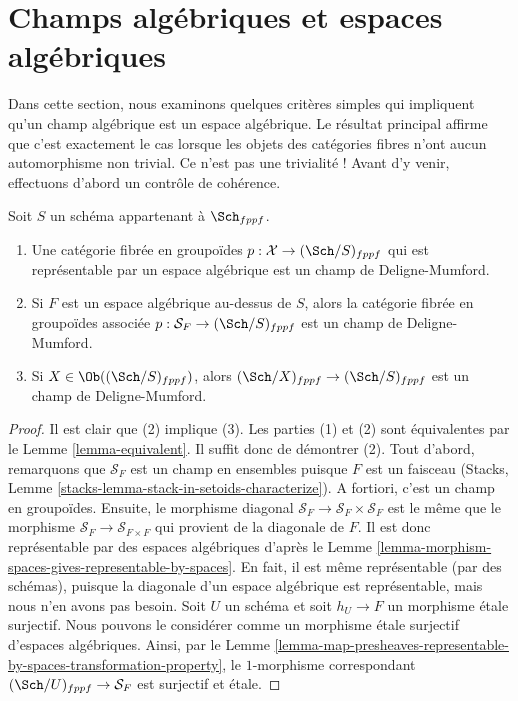 \section{Champs algébriques et espaces algébriques}
\label{section-stacks-spaces}

\noindent
Dans cette section, nous examinons quelques critères simples qui impliquent qu'un
champ algébrique est un espace algébrique. Le résultat principal affirme que c'est
exactement le cas lorsque les objets des catégories fibres n'ont aucun
automorphisme non trivial. Ce n'est pas une trivialité ! Avant d'y venir,
effectuons d'abord un contrôle de cohérence.

\begin{lemma}
\label{lemma-representable-algebraic}
Soit $S$ un schéma appartenant à $\Sch_{fppf}$.
\begin{enumerate}
\item Une catégorie fibrée en groupoïdes
$p : \mathcal{X} \to (\Sch/S)_{fppf}$
qui est représentable par un espace algébrique est un champ de Deligne-Mumford.
\item Si $F$ est un espace algébrique au-dessus de $S$, alors la
catégorie fibrée en groupoïdes associée
$p : \mathcal{S}_F \to (\Sch/S)_{fppf}$
est un champ de Deligne-Mumford.
\item Si $X \in \Ob((\Sch/S)_{fppf})$, alors
$(\Sch/X)_{fppf} \to (\Sch/S)_{fppf}$ est
un champ de Deligne-Mumford.
\end{enumerate}
\end{lemma}

\begin{proof}
Il est clair que (2) implique (3).
Les parties (1) et (2) sont équivalentes par le Lemme \ref{lemma-equivalent}.
Il suffit donc de démontrer (2).
Tout d'abord, remarquons que $\mathcal{S}_F$ est un champ en ensembles puisque
$F$ est un faisceau (Stacks, Lemme
\ref{stacks-lemma-stack-in-setoids-characterize}).
A fortiori, c'est un champ en groupoïdes. Ensuite, le morphisme diagonal
$\mathcal{S}_F \to \mathcal{S}_F  \times \mathcal{S}_F$
est le même que le morphisme $\mathcal{S}_F \to \mathcal{S}_{F \times F}$
qui provient de la diagonale de $F$. Il est donc représentable
par des espaces algébriques d'après le
Lemme \ref{lemma-morphism-spaces-gives-representable-by-spaces}.
En fait, il est même représentable (par des schémas), puisque la diagonale d'un
espace algébrique est représentable, mais nous n'en avons pas besoin.
Soit $U$ un schéma et soit $h_U \to F$ un morphisme \'etale surjectif.
Nous pouvons le considérer comme un morphisme \'etale surjectif d'espaces algébriques.
Ainsi, par le
Lemme
\ref{lemma-map-presheaves-representable-by-spaces-transformation-property},
le $1$-morphisme correspondant $(\Sch/U)_{fppf} \to \mathcal{S}_F$
est surjectif et \'etale.
\end{proof}

